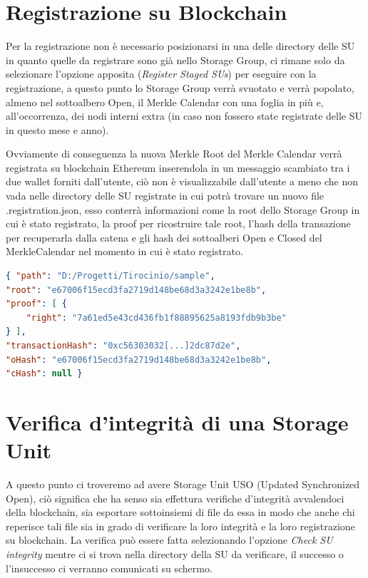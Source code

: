 \section{Registrazione su Blockchain}
\label{sub:regbc}
Per la registrazione non è necessario posizionarsi in una delle directory delle SU
in quanto quelle da registrare sono già nello Storage Group, ci rimane solo
da selezionare l’opzione apposita (\emph{Register Staged SUs}) per eseguire
con la registrazione, a questo punto lo Storage Group verrà svuotato
e verrà popolato, almeno nel sottoalbero Open, il Merkle Calendar con una foglia
in più e, all’occorrenza, dei nodi interni extra (in caso non fossero state
registrate delle SU in questo mese e anno).

Ovviamente di conseguenza la nuova Merkle Root del Merkle Calendar verrà registrata su
blockchain Ethereum inserendola in un messaggio scambiato tra i due wallet forniti dall’utente,
ciò non è visualizzabile dall’utente a meno che non vada nelle directory delle SU registrate 
in cui potrà trovare un nuovo file \textsf{.registration.json}, esso conterrà informazioni
come la root dello Storage Group in cui è stato registrato, la proof per ricostruire tale root,
l’hash della transazione per recuperarla dalla catena e gli hash dei sottoalberi Open e Closed
del MerkleCalendar nel momento in cui è stato registrato.

\singlespacing
\begin{lstlisting}[language=json,firstnumber=1]
{ "path": "D:/Progetti/Tirocinio/sample",
"root": "e67006f15ecd3fa2719d148be68d3a3242e1be8b",
"proof": [ {
    "right": "7a61ed5e43cd436fb1f88895625a8193fdb9b3be"
} ],
"transactionHash": "0xc56303032[...]2dc87d2e",
"oHash": "e67006f15ecd3fa2719d148be68d3a3242e1be8b",
"cHash": null }  
\end{lstlisting}
\onehalfspacing

\newpage

\section{Verifica d’integrità di una Storage Unit}

A questo punto ci troveremo ad avere Storage Unit USO (Updated Synchronized Open), ciò
significa che ha senso sia effettura verifiche d’integrità avvalendoci della blockchain,
sia esportare sottoinsiemi di file da essa in modo che anche chi reperisce tali file sia
in grado di verificare la loro integrità e la loro registrazione su blockchain.
La verifica può essere fatta selezionando l’opzione \emph{Check SU integrity}
mentre ci si trova nella directory della SU da verificare, il successo o
l’insuccesso ci verranno comunicati su schermo.

